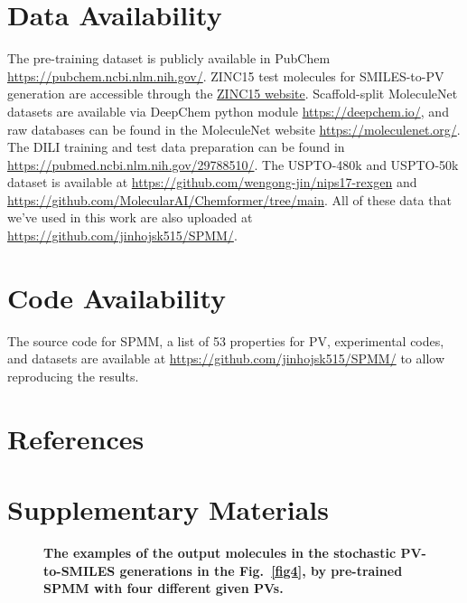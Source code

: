 \documentclass{nature_meth}
\newcommand{\1}{\blmath{1}}
\newcommand{\0}{\blmath{0}}
\begin{document}
\section*{Data Availability}
The pre-training dataset is publicly available in PubChem \href{https://pubchem.ncbi.nlm.nih.gov/}{https://pubchem.ncbi.nlm.nih.gov/}. ZINC15 test molecules for SMILES-to-PV generation are accessible through the \href{https://zinc15.docking.org/}{ZINC15 website}. Scaffold-split MoleculeNet datasets are available via DeepChem python module \href{https://deepchem.io/}{https://deepchem.io/}, and raw databases can be found in the MoleculeNet website \href{https://moleculenet.org/}{https://moleculenet.org/}. The DILI training and test data preparation can be found in \href{https://pubmed.ncbi.nlm.nih.gov/29788510/}{https://pubmed.ncbi.nlm.nih.gov/29788510/}. The USPTO-480k and USPTO-50k dataset is available at \href{https://github.com/wengong-jin/nips17-rexgen}{https://github.com/wengong-jin/nips17-rexgen} and \href{https://github.com/MolecularAI/Chemformer/tree/main}{https://github.com/MolecularAI/Chemformer/tree/main}. All of these data that we've used in this work are also uploaded at \href{https://github.com/jinhojsk515/SPMM/}{https://github.com/jinhojsk515/SPMM/}.

\section*{Code Availability}
The source code for SPMM, a list of 53 properties for PV, experimental codes, and datasets are available at \href{https://github.com/jinhojsk515/SPMM/}{https://github.com/jinhojsk515/SPMM/} to allow reproducing the results.

\section*{References}



\newpage

\section*{Supplementary Materials}
\setcounter{figure}{0}
\renewcommand{\thefigure}{S\arabic{figure}}
\setcounter{table}{0}
\renewcommand{\thetable}{S\arabic{table}}

\begin{figure}[!h]
	\centering
 \centerline{}
	\caption{\bf\footnotesize 
The examples of the output molecules in the stochastic PV-to-SMILES generations in the Fig.~\ref{fig4}, by pre-trained SPMM with four different given PVs.}
	\label{suppl4}
\end{figure}
\end{document}
